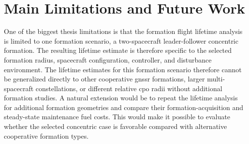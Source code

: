 \section{Main Limitations and Future Work}

One of the biggest thesis limitations is that the formation flight lifetime analysis is limited to one formation scenario, a two-spacecraft leader-follower concentric formation. The resulting lifetime estimate is therefore specific to the selected formation radius, spacecraft configuration, controller, and disturbance environment. The lifetime estimates for this formation scenario therefore cannot be generalized directly to other cooperative \gls{gnssr} formations, larger multi-spacecraft constellations, or different relative \gls{cpo} radii without additional formation studies. A natural extension would be to repeat the lifetime analysis for additional formation geometries and compare their formation-acquisition and steady-state maintenance fuel costs. This would make it possible to evaluate whether the selected concentric case is favorable compared with alternative cooperative formation types.

